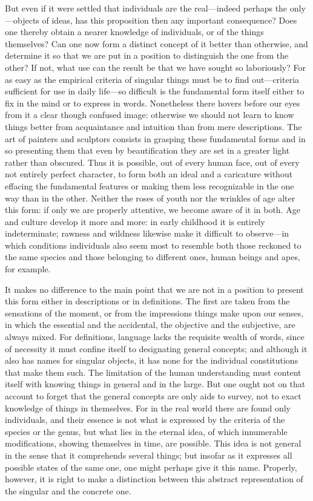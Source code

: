 \documentclass[12pt,a4paper]{article}
\begin{document}
But even if it were settled that individuals are the real---indeed perhaps the
only---objects of ideas, has this proposition then any important consequence?
Does one thereby obtain a nearer knowledge of individuals, or of the things
themselves? Can one now form a distinct concept of it better than otherwise, and
determine it so that we are put in a position to distinguish the one from the
other? If not, what use can the result be that we have sought so laboriously?
For as easy as the empirical criteria of singular things must be to find
out---criteria sufficient for use in daily life---so difficult is the
fundamental form itself either to fix in the mind or to express in words.
Nonetheless there hovers before our eyes from it a clear though confused image:
otherwise we should not learn to know things better from acquaintance and
intuition than from mere descriptions. The art of painters and sculptors
consists in grasping these fundamental forms and in so presenting them that even
by beautification they are set in a greater light rather than obscured. Thus it
is possible, out of every human face, out of every not entirely perfect
character, to form both an ideal and a caricature without effacing the
fundamental features or making them less recognizable in the one
way than in the other. Neither the roses of youth nor the wrinkles of age alter
this form: if only we are properly attentive, we become aware of it in both. Age
and culture develop it more and more: in early childhood it is entirely
indeterminate; rawness and wildness likewise make it difficult to observe---in
which conditions individuals also seem most to resemble both those reckoned to
the same species and those belonging to different ones, human beings and apes,
for example.

It makes no difference to the main point that we are not in a position to
present this form either in descriptions or in definitions. The first are taken
from the sensations of the moment, or from the impressions things make upon our
senses, in which the essential and the accidental, the objective and the
subjective, are always mixed. For definitions, language lacks the requisite
wealth of words, since of necessity it must confine itself to designating
general concepts; and although it also has names for singular objects, it has
none for the individual constitutions that make them such. The limitation of the
human understanding must content itself with knowing things in general and in
the large. But one ought not on that account to forget that the general concepts
are only aids to survey, not to exact knowledge of things in themselves.
For in the real world there are found only individuals, and their essence is not
what is expressed by the criteria of the species or the genus, but what lies in
the eternal idea, of which innumerable modifications, showing themselves in
time, are possible. This idea is not general in the sense that it comprehends
several things; but insofar as it expresses all possible states of the same one,
one might perhaps give it this name. Properly, however, it is
right to make a distinction between this abstract representation of the singular
and the concrete one.
\end{document}
